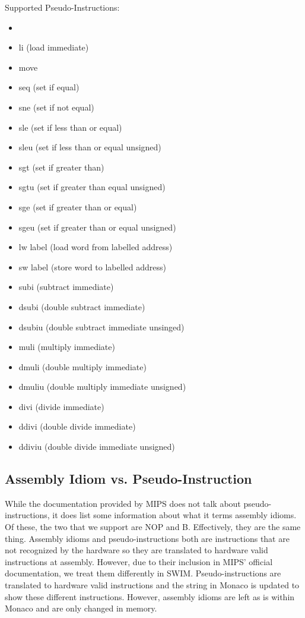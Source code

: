 \documentclass[
    paper=letter,
    parskip=half,
    fontsize=12pt,
    titlepage=firstiscover,
    toc=bibliography,
    numbers=endperiod
]{scrartcl}
\begin{document}
Supported Pseudo-Instructions:
\begin{itemize}
    \item
    \item li (load immediate)
    \item move
    \item seq (set if equal)
    \item sne (set if not equal)
    \item sle (set if less than or equal)
    \item sleu (set if less than or equal unsigned)
    \item sgt (set if greater than)
    \item sgtu (set if greater than equal unsigned)
    \item sge (set if greater than or equal)
    \item sgeu (set if greater than or equal unsigned)
    \item lw label (load word from labelled address)
    \item sw label (store word to labelled address)
    \item subi (subtract immediate)
    \item dsubi (double subtract immediate)
    \item dsubiu (double subtract immediate unsinged)
    \item muli (multiply immediate)
    \item dmuli (double multiply immediate)
    \item dmuliu (double multiply immediate unsigned)
    \item divi (divide immediate)
    \item ddivi (double divide immediate)
    \item ddiviu (double divide immediate unsigned)

\end{itemize}

\subsection{Assembly Idiom vs. Pseudo-Instruction}
While the documentation provided by MIPS does not talk about
pseudo-instructions, it does list some information about what it terms
assembly idioms. Of these, the two that we support are NOP and B\@.
Effectively, they are the same thing. Assembly idioms and
pseudo-instructions both are instructions that are not recognized by the
hardware so they are translated to hardware valid instructions at
assembly. However, due to their inclusion in MIPS' official
documentation, we treat them differently in SWIM. Pseudo-instructions
are translated to hardware valid instructions and the string in Monaco
is updated to show these different instructions. However, assembly
idioms are left as is within Monaco and are only changed in memory.
\end{document}
